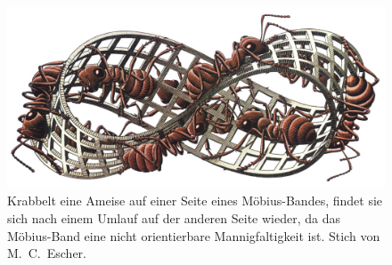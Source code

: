 %
%
%
\begin{figure}
\centering
\includegraphics[width=\textwidth]{chapters/040-green/images/ants.jpg}
\caption{Krabbelt eine Ameise auf einer Seite eines Möbius-Bandes,
findet sie sich nach einem Umlauf auf der anderen Seite wieder, da
das Möbius-Band eine nicht orientierbare Mannigfaltigkeit ist.
Stich von M.~C.~Escher.
\label{buch:green:fig:ants}}
\end{figure}
